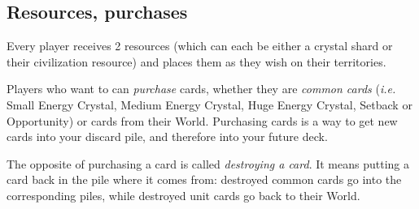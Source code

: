 \documentclass[a4paper]{article}
\begin{document}
        
    \subsection{Resources, purchases}
        \label{how-to-purchase}
        Every player receives 2 resources (which can each be either a crystal shard
        or their civilization resource) and places them as they wish on their territories.
        
        Players who want to can \textit{purchase} cards,
        whether they are \textit{common cards} (\textit{i.e.} Small Energy Crystal,
        Medium Energy Crystal, Huge Energy Crystal, Setback or Opportunity)
        or cards from their World.
        Purchasing cards is a way to get new cards into your discard pile,
        and therefore into your future deck.
        
        The opposite of  purchasing a card is called \textit{destroying a card}.
        It means putting a card back in the pile where it comes from:
        destroyed common cards go into the corresponding piles,
        while destroyed unit cards go back to their World.
\end{document}
